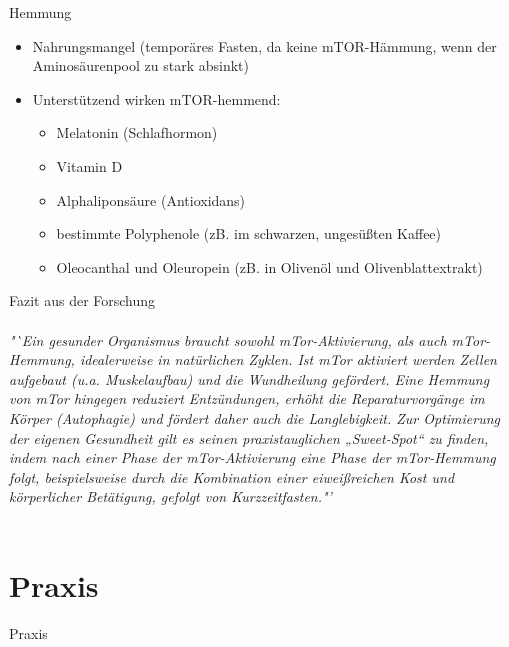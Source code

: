 \documentclass[xcolor=dvipsnames]{beamer}
\begin{document}
\begin{frame}[allowframebreaks]
        \begin{block}{Hemmung}
            \begin{itemize}
                \setlength\itemsep{1em}
                \item Nahrungsmangel (temporäres Fasten, da keine mTOR-Hämmung, wenn der Aminosäurenpool zu stark absinkt)
                \item Unterstützend wirken mTOR-hemmend:
                \begin{itemize}
                    \item Melatonin (Schlafhormon)
                    \item Vitamin D
                    \item Alphaliponsäure (Antioxidans)
                    \item bestimmte Polyphenole (zB. im schwarzen, ungesüßten Kaffee)
                    \item Oleocanthal und Oleuropein (zB. in Olivenöl und Olivenblattextrakt)
                \end{itemize}
            \end{itemize}
        \end{block}

        \framebreak

        \begin{block}{Fazit aus der Forschung}
            \\~\\
            \textit{"`Ein gesunder Organismus braucht sowohl mTor-Aktivierung, als auch mTor-Hemmung, idealerweise
            in natürlichen Zyklen. Ist mTor aktiviert werden Zellen aufgebaut (u.a. Muskelaufbau) und die Wundheilung
            gefördert. Eine Hemmung von mTor hingegen reduziert Entzündungen, erhöht die Reparaturvorgänge im Körper
            (Autophagie) und fördert daher auch die Langlebigkeit. Zur Optimierung der eigenen Gesundheit gilt es seinen
            praxistauglichen „Sweet-Spot“ zu finden, indem nach einer Phase der mTor-Aktivierung eine Phase der
            mTor-Hemmung folgt, beispielsweise durch die Kombination einer eiweißreichen Kost und körperlicher
            Betätigung, gefolgt von Kurzzeitfasten."'}
            \\~\\
        \end{block}
    \end{frame}

    \section{Praxis}
    {
        \begin{frame}
            \begin{center}
                \Huge Praxis
            \end{center}
        \end{frame}
    }
\end{document}

